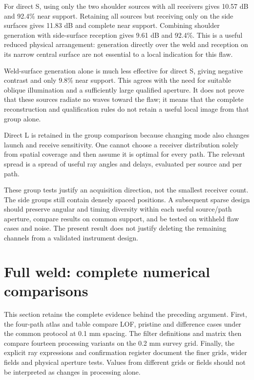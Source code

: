 For direct S, using only the two shoulder sources with all receivers gives 10.57 dB and 92.4\% near support. Retaining all sources but receiving only on the side surfaces gives 11.83 dB and complete near support. Combining shoulder generation with side-surface reception gives 9.61 dB and 92.4\%. This is a useful reduced physical arrangement: generation directly over the weld and reception on its narrow central surface are not essential to a local indication for this flaw.

Weld-surface generation alone is much less effective for direct S, giving negative contrast and only 9.8\% near support. This agrees with the need for suitable oblique illumination and a sufficiently large qualified aperture. It does not prove that these sources radiate no waves toward the flaw; it means that the complete reconstruction and qualification rules do not retain a useful local image from that group alone.

Direct L is retained in the group comparison because changing mode also changes launch and receive sensitivity. One cannot choose a receiver distribution solely from spatial coverage and then assume it is optimal for every path. The relevant spread is a spread of useful ray angles and delays, evaluated per source and per path.

These group tests justify an acquisition direction, not the smallest receiver count. The side groups still contain densely spaced positions. A subsequent sparse design should preserve angular and timing diversity within each useful source/path aperture, compare results on common support, and be tested on withheld flaw cases and noise. The present result does not justify deleting the remaining channels from a validated instrument design.


\section{Full weld: complete numerical comparisons}

\label{saftapp:archive:full:complete}
This section retains the complete evidence behind the preceding argument. First, the four-path atlas and table compare LOF, pristine and difference cases under the common protocol at 0.1 mm spacing. The filter definitions and matrix then compare fourteen processing variants on the 0.2 mm survey grid. Finally, the explicit ray expressions and confirmation register document the finer grids, wider fields and physical aperture tests. Values from different grids or fields should not be interpreted as changes in processing alone.

